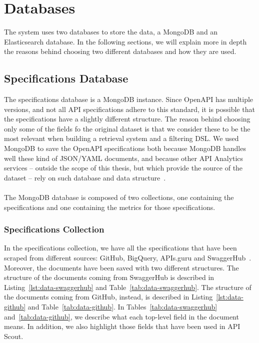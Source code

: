 \section{Databases}\label{sec:databases}

The system uses two databases to store the data, a MongoDB and an Elasticsearch database.
In the following sections, we will explain more in depth the reasons behind choosing two different databases and how they are used.

\subsection{Specifications Database}\label{subsec:specifications-database}
The specifications database is a MongoDB instance.
Since OpenAPI has multiple versions, and not all API specifications adhere to this standard, it is possible that the specifications have a slightly different structure.
The reason behind choosing only some of the fields fo the original dataset is that we consider these to be the most relevant when building a retrieval system and a filtering DSL\@.
We used MongoDB to save the OpenAPI specifications both because MongoDB handles well these kind of JSON/YAML documents, and because other API Analytics services -- outside the scope of this thesis, but which provide the source of the dataset -- rely on such database and data structure~\cite{souhaila_serbout_apistic_2024}. \\ \\
The MongoDB database is composed of two collections, one containing the specifications and one containing the metrics for those specifications.

\subsubsection{Specifications Collection}
In the specifications collection, we have all the specifications that have been scraped from different sources: GitHub, BigQuery, APIs.guru and SwaggerHub~\cite{souhaila_serbout_apistic_2024}.
Moreover, the documents have been saved with two different structures.
The structure of the documents coming from SwaggerHub is described in Listing~\ref{lst:data-swaggerhub} and Table~\ref{tab:data-swaggerhub}.
The structure of the documents coming from GitHub, instead, is described in Listing~\ref{lst:data-github} and Table~\ref{tab:data-github}.
In Tables~\ref{tab:data-swaggerhub} and~\ref{tab:data-github}, we describe what each top-level field in the document means.
In addition, we also highlight those fields that have been used in API Scout.

